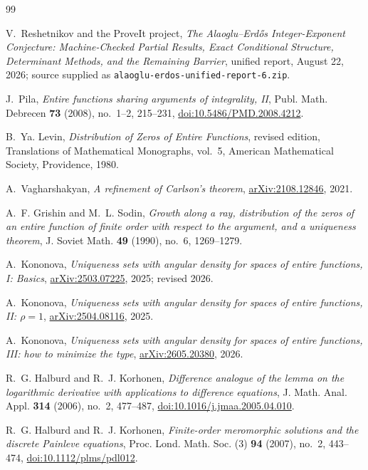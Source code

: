 \documentclass[11pt,oneside]{article}
\theoremstyle{definition}
\theoremstyle{remark}
\begin{document}
\begin{thebibliography}{99}

V.~Reshetnikov and the ProveIt project,
\emph{The Alaoglu--Erd\H{o}s Integer-Exponent Conjecture: Machine-Checked Partial Results,
Exact Conditional Structure, Determinant Methods, and the Remaining Barrier},
unified report, August 22, 2026; source supplied as
\texttt{alaoglu-erdos-unified-report-6.zip}.

J.~Pila,
\emph{Entire functions sharing arguments of integrality, II},
Publ. Math. Debrecen \textbf{73} (2008), no.~1--2, 215--231,
\href{https://doi.org/10.5486/PMD.2008.4212}{doi:10.5486/PMD.2008.4212}.

B.~Ya. Levin,
\emph{Distribution of Zeros of Entire Functions}, revised edition,
Translations of Mathematical Monographs, vol.~5,
American Mathematical Society, Providence, 1980.

A.~Vagharshakyan,
\emph{A refinement of Carlson's theorem},
\href{https://arxiv.org/abs/2108.12846}{arXiv:2108.12846}, 2021.

A.~F. Grishin and M.~L. Sodin,
\emph{Growth along a ray, distribution of the zeros of an entire function of finite order
with respect to the argument, and a uniqueness theorem},
J. Soviet Math. \textbf{49} (1990), no.~6, 1269--1279.

A.~Kononova,
\emph{Uniqueness sets with angular density for spaces of entire functions, I: Basics},
\href{https://arxiv.org/abs/2503.07225}{arXiv:2503.07225}, 2025; revised 2026.

A.~Kononova,
\emph{Uniqueness sets with angular density for spaces of entire functions, II: $\rho=1$},
\href{https://arxiv.org/abs/2504.08116}{arXiv:2504.08116}, 2025.

A.~Kononova,
\emph{Uniqueness sets with angular density for spaces of entire functions, III: how to
minimize the type},
\href{https://arxiv.org/abs/2605.20380}{arXiv:2605.20380}, 2026.

R.~G. Halburd and R.~J. Korhonen,
\emph{Difference analogue of the lemma on the logarithmic derivative with applications to
difference equations},
J. Math. Anal. Appl. \textbf{314} (2006), no.~2, 477--487,
\href{https://doi.org/10.1016/j.jmaa.2005.04.010}{doi:10.1016/j.jmaa.2005.04.010}.

R.~G. Halburd and R.~J. Korhonen,
\emph{Finite-order meromorphic solutions and the discrete Painleve equations},
Proc. Lond. Math. Soc. (3) \textbf{94} (2007), no.~2, 443--474,
\href{https://doi.org/10.1112/plms/pdl012}{doi:10.1112/plms/pdl012}.


\end{thebibliography}
\end{document}

